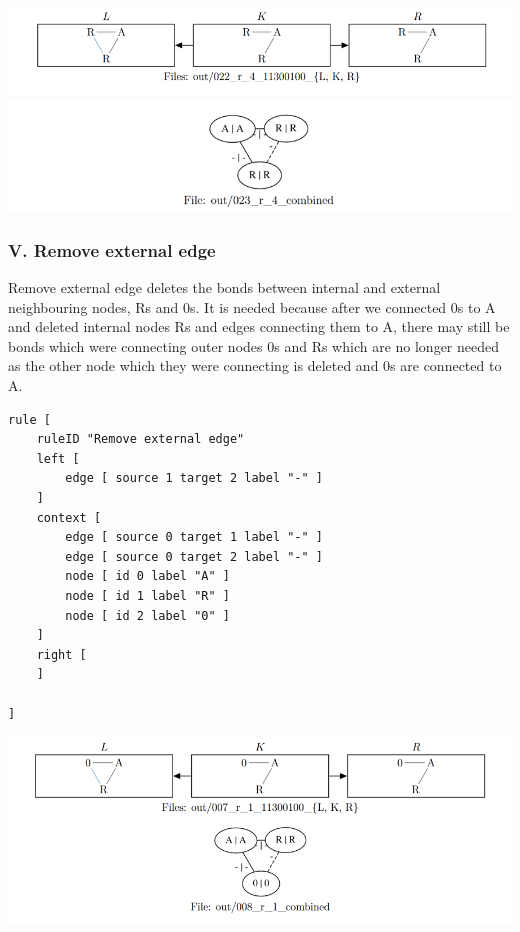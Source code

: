 \documentclass[a4paper,10pt,titlepage]{report}
\begin{document}
\vspace{10mm}
\includegraphics[scale=0.7]{iv_1.png}
\includegraphics[scale=0.7]{iv_2.png}
\vspace{10mm}

\subsubsection{V. Remove external edge}

Remove external edge deletes the bonds between internal and external neighbouring nodes, Rs and 0s. It is needed because after we connected 0s to A and deleted internal nodes Rs and edges connecting them to A, there may still be bonds which were connecting outer nodes 0s and Rs which are no longer needed as the other node which they were connecting is deleted and 0s are connected to A. 

\begin{lstlisting}
rule [
	ruleID "Remove external edge"
	left [
		edge [ source 1 target 2 label "-" ]
	]
	context [
		edge [ source 0 target 1 label "-" ]
		edge [ source 0 target 2 label "-" ]
	    node [ id 0 label "A" ]
		node [ id 1 label "R" ]
		node [ id 2 label "0" ]
	]
	right [
	]

]
\end{lstlisting}

\vspace{10mm}
\includegraphics[scale=0.7]{v.png}
\vspace{10mm}
\end{document}
